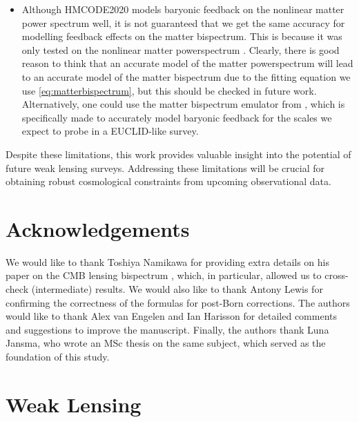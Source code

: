 \documentclass[11pt]{article} %
\begin{document}
\begin{itemize}
    \item Although HMCODE2020 models baryonic feedback on the nonlinear matter power spectrum well, it is not guaranteed that we get the same accuracy for modelling feedback effects on the matter bispectrum. This is because it was only tested on the nonlinear matter powerspectrum \cite{Mead_2021}. Clearly, there is good reason to think that an accurate model of the matter powerspectrum will lead to an accurate model of the matter bispectrum due to the fitting equation we use \eqref{eq:matterbispectrum}, but this should be checked in future work. Alternatively, one could use the matter bispectrum emulator from \cite{Burger_2026}, which is specifically made to accurately model baryonic feedback for the scales we expect to probe in a EUCLID-like survey.
    
\end{itemize}

Despite these limitations, this work provides valuable insight into the potential of future weak lensing surveys. Addressing these limitations will be crucial for obtaining robust cosmological constraints from upcoming observational data.

\section*{Acknowledgements}
We would like to thank Toshiya Namikawa for providing extra details on his paper on the CMB lensing bispectrum \cite{Namikawa_2016}, which, in particular, allowed us to cross-check (intermediate) results. We would also like to thank Antony Lewis for confirming the correctness of the formulas for post-Born corrections. The authors would like to thank Alex van Engelen and Ian Harisson for detailed comments and suggestions to improve the manuscript. Finally, the authors thank Luna Jansma, who wrote an MSc thesis on the same subject, which served as the foundation of this study. 

\printbibliography

\appendix

\section{Weak Lensing}\label{sec:weaklensing}
\end{document}
